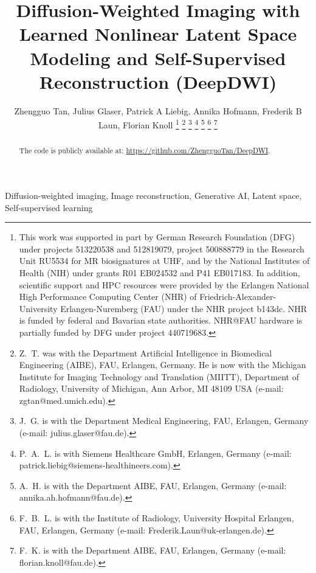 \documentclass[journal,twoside,web]{ieeecolor}
\begin{document}
	\title{Diffusion-Weighted Imaging with Learned Nonlinear Latent Space Modeling and Self-Supervised Reconstruction (DeepDWI)}

	\author{Zhengguo Tan, Julius Glaser, Patrick A Liebig, Annika Hofmann, Frederik B Laun, Florian Knoll
		\thanks{This work was supported in part by
			German Research Foundation (DFG)
			under projects 513220538 and 512819079,
			project 500888779 in the Research Unit RU5534
			for MR biosignatures at UHF,
			and by the National Institutes of Health (NIH)
			under grants R01 EB024532 and P41 EB017183.
			In addition, scientific support and HPC resources
			were provided by
			the Erlangen National High Performance Computing Center (NHR)
			of Friedrich-Alexander-University Erlangen-Nuremberg (FAU)
			under the NHR project b143dc.
			NHR is funded by federal and Bavarian state authorities.
			NHR@FAU hardware is partially funded by
			DFG under project 440719683.}
		\thanks{Z.~T. was with the Department
			Artificial Intelligence in Biomedical Engineering (AIBE),
			FAU, Erlangen, Germany.
			He is now with
			the Michigan Institute for Imaging Technology and Translation
			(MIITT),
			Department of Radiology,
			University of Michigan, Ann Arbor, MI 48109 USA
			(e-mail: zgtan@med.umich.edu).}
		\thanks{J.~G. is with the Department Medical Engineering,
			FAU, Erlangen, Germany
			(e-mail: julius.glaser@fau.de).}
		\thanks{P.~A.~L. is with Siemens Healthcare GmbH, Erlangen, Germany
			(e-mail: patrick.liebig@siemens-healthineers.com).}
		\thanks{A.~H. is with the Department AIBE,
			FAU, Erlangen, Germany
			(e-mail: annika.ah.hofmann@fau.de).}
		\thanks{F.~B.~L. is with the Institute of Radiology,
			University Hospital Erlangen,
			FAU, Erlangen, Germany
			(e-mail: Frederik.Laun@uk-erlangen.de).}
		\thanks{F.~K. is with the Department AIBE,
			FAU, Erlangen, Germany
			(e-mail: florian.knoll@fau.de).}
	}

	\maketitle

	\begin{abstract}
		The code is publicly available at: \url{https://github.com/ZhengguoTan/DeepDWI}.
	\end{abstract}

	\begin{IEEEkeywords}
	Diffusion-weighted imaging, Image reconstruction, Generative AI, Latent space, Self-supervised learning
	\end{IEEEkeywords}
\end{document}
